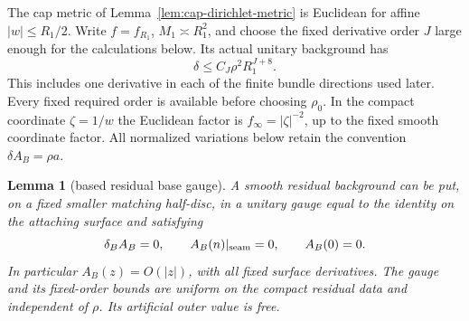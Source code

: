 \documentclass[11pt]{amsart}
\newtheorem{lemma}[theorem]{Lemma}
\theoremstyle{definition}
\theoremstyle{remark}
\theoremstyle{plain}
\begin{document}
The cap metric of Lemma~\ref{lem:cap-dirichlet-metric} is Euclidean
for affine $|w|\leq R_1/2$. Write $f=f_{R_1}$, $M_1\asymp R_1^2$,
and choose the fixed derivative order $J$ large enough for the
calculations below. Its actual unitary background has
\begin{equation}\label{eq:gluing-cap-background-error}
 \delta\leq C_J\rho^2R_1^{J+8}.
\end{equation}
This includes one derivative in each of the finite bundle directions
used later. Every fixed required order is available before choosing
$\rho_0$. In the compact coordinate $\zeta=1/w$ the Euclidean
factor is $f_\infty=|\zeta|^{-2}$, up to the fixed smooth coordinate
factor. All normalized variations below retain the convention
$\delta A_B=\rho a$.

\begin{lemma}[based residual base gauge]\label{lem:gluing-residual-background}
A smooth residual background can be put, on a fixed smaller matching
half-disc, in a unitary gauge equal to the identity on the attaching
surface and satisfying
\[
 \delta_B A_B=0,\qquad A_B(n)|_{\rm seam}=0,\qquad A_B(0)=0.
\]
In particular $A_B(z)=O(|z|)$, with all fixed surface derivatives.
The gauge and its fixed-order bounds are uniform on the compact
residual data and independent of $\rho$. Its artificial outer value
is free.
\end{lemma}
\end{document}
